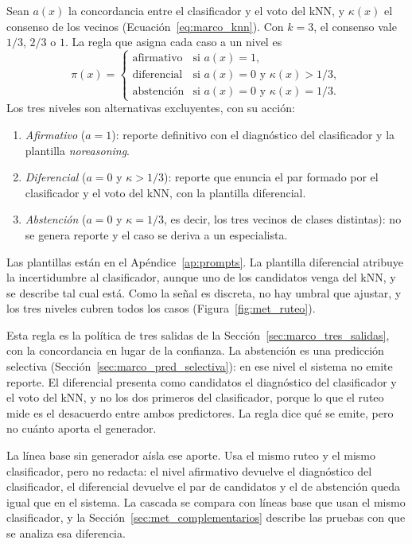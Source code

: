 Sean $a(x)$ la concordancia entre el clasificador y el voto del kNN, y $\kappa(x)$ el consenso de los vecinos
(Ecuación~\ref{eq:marco_knn}). Con $k = 3$, el consenso vale $1/3$, $2/3$ o $1$. La regla que asigna cada caso a un
nivel es
\begin{equation}
    \pi(x) =
    \begin{cases}
        \text{afirmativo} & \text{si } a(x) = 1,\\
        \text{diferencial} & \text{si } a(x) = 0 \text{ y } \kappa(x) > 1/3,\\
        \text{abstención} & \text{si } a(x) = 0 \text{ y } \kappa(x) = 1/3.
    \end{cases}
    \label{eq:met_politica_ruteo}
\end{equation}
Los tres niveles son alternativas excluyentes, con su acción:
\begin{enumerate}
    \item \emph{Afirmativo} ($a = 1$): reporte definitivo con el diagnóstico del clasificador y la plantilla
    \emph{noreasoning}.
    \item \emph{Diferencial} ($a = 0$ y $\kappa > 1/3$): reporte que enuncia el par formado por el clasificador y el
    voto del kNN, con la plantilla diferencial.
    \item \emph{Abstención} ($a = 0$ y $\kappa = 1/3$, es decir, los tres vecinos de clases distintas): no se genera
    reporte y el caso se deriva a un especialista.
\end{enumerate}
Las plantillas están en el Apéndice~\ref{ap:prompts}. La plantilla diferencial atribuye la incertidumbre al
clasificador, aunque uno de los candidatos venga del kNN, y se describe tal cual está. Como la señal es discreta, no hay
umbral que ajustar, y los tres niveles cubren todos los casos (Figura~\ref{fig:met_ruteo}).



Esta regla es la política de tres salidas de la Sección~\ref{sec:marco_tres_salidas}, con la concordancia en lugar de la
confianza. La abstención es una predicción selectiva (Sección~\ref{sec:marco_pred_selectiva}): en ese nivel el sistema
no emite reporte. El diferencial presenta como candidatos el diagnóstico del clasificador y el voto del kNN, y no los
dos primeros del clasificador, porque lo que el ruteo mide es el desacuerdo entre ambos predictores. La regla dice
qué se emite, pero no cuánto aporta el generador.

La línea base sin generador aísla ese aporte. Usa el mismo ruteo y el mismo clasificador, pero no redacta: el nivel
afirmativo devuelve el diagnóstico del clasificador, el diferencial devuelve el par de candidatos y el de abstención
queda igual que en el sistema. La cascada se compara con líneas base que usan el mismo clasificador, y la
Sección~\ref{sec:met_complementarios} describe las pruebas con que se analiza esa diferencia.
